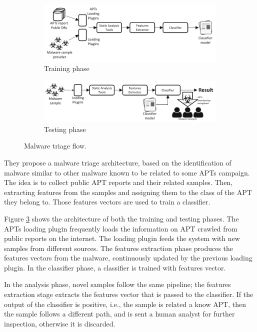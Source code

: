 \begin{figure}
	\centering
	\begin{subfigure}{1.0\textwidth}
		\centering		\includegraphics[width=1.0\linewidth]{train.png}  
		\caption{Training phase}
		\label{fig:sub-train}
	\end{subfigure}
	
	\begin{subfigure}{1.0\textwidth}
		\centering
		\includegraphics[width=1.0\linewidth]{test.png}  
		\caption{Testing phase}
		\label{fig:sub-test}
	\end{subfigure}
	
	\caption{Malware triage flow.}
	\label{fig:mal_triage}
\end{figure}

They propose a malware triage architecture, based on the identification of malware similar to other malware known to be related to some APTs campaign. The idea is to collect public APT reports and their related samples.  Then, extracting features from the samples and assigning them to the class of the APT they belong to. Those features vectors are used to train a classifier.

Figure \ref{fig:mal_triage} shows the architecture of both the training and testing phases. The APTs loading plugin frequently loads the information on APT crawled from public reports on the internet. The loading plugin feeds the system with new samples from different sources. The features extraction phase produces the features vectors from the malware, continuously updated by the previous loading plugin. In the classifier phase, a classifier is trained with features vector. 

In the analysis phase, novel samples follow the same pipeline; the features extraction stage extracts the features vector that is passed to the classifier. If the output of the classifier is positive, i.e., the sample is related a know APT, then the sample follows a different path, and is sent a human analyst for further inspection, otherwise it is discarded.

